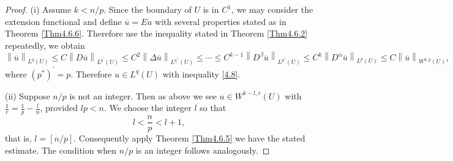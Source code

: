 \begin{proof}
(i) Assume $k<n/p$. Since the boundary of $U$ is in $C^1$, we may consider the extension functional and define $\overline{u}=Eu$ with several properties stated as in Theorem \ref{Thm4.6.6}. Therefore use the inequality stated in Theorem \ref{Thm4.6.2} repeatedly, we obtain 
$$
\left\| \overline{u} \right\| _{L^q\left( U \right)}\le C\left\| D\overline{u} \right\| _{L^{q^{\prime}}\left( U \right)}\le C^2\left\| \Delta \overline{u} \right\| _{L^{q^{\prime\prime}}\left( U \right)}\le \cdots \le C^{k-1}\left\| D^{\beta}\overline{u} \right\| _{L^{p^*}\left( U \right)}\le C^k\left\| D^{\alpha}\overline{u} \right\| _{L^p\left( U \right)}\le C \left\| \overline{u} \right\| _{W^{k,p}\left( U \right)},
$$
where $(p^*)^\prime=p$. Therefore $u\in L^q(U)$ with inequality \eqref{4.8}.\par
(ii) Suppose $n/p$ is not an integer. Then as above we see $u\in W^{k-l,r}(U)$ with $\frac{1}{r}=\frac{1}{p}-\frac{l}{n}$, provided $lp<n$. We choose the integer $l$ so that 
$$l<\frac{n}{p}<l+1,$$
that is, $l=[n/p]$. Consequently apply Theorem \ref{Thm4.6.5} we have the stated estimate. The condition when $n/p$ is an integer follows analogously.
\end{proof}
